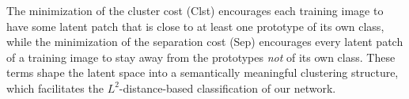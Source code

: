 \documentclass{article}
\theoremstyle{definition}
\theoremstyle{remark}
\begin{document}

The minimization of the cluster cost (Clst) encourages each training image to have some latent patch that is close to at least one prototype of its own class, while the minimization of the separation cost (Sep) encourages every latent patch of a training image to stay away from the prototypes \textit{not} of its own class. These terms shape the latent space into a semantically meaningful clustering structure, which facilitates the $L^2$-distance-based classification of our network.
\end{document}
